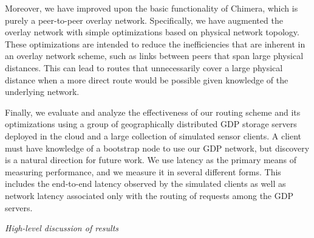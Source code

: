 Moreover, we have improved upon the basic functionality of Chimera, which is purely a peer-to-peer overlay network. Specifically, we have augmented the overlay network with simple optimizations based on physical network topology. These optimizations are intended to reduce the inefficiencies that are inherent in an overlay network scheme, such as links between peers that span  large physical distances. This can lead to routes that unnecessarily cover a large physical distance when a more direct route would be possible given knowledge of the underlying network.

Finally, we evaluate and analyze the effectiveness of our routing scheme and its optimizations using a group of geographically distributed GDP storage servers deployed in the cloud and a large collection of simulated sensor clients. A client must have knowledge of a bootstrap node to use our GDP network, but discovery is a natural direction for future work. We use latency as the primary means of measuring performance, and we measure it in several different forms. This includes the end-to-end latency observed by the simulated clients as well as network latency associated only with the routing of requests among the GDP servers.

\textit{High-level discussion of results}
